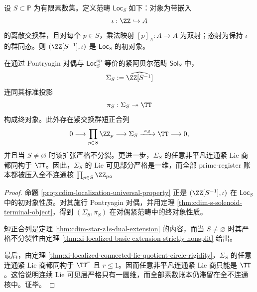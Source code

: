 \begin{theorem}\label{thm:conclusion-finite-prime-solenoid-terminal-object}
设 \(S\subset \mathbb P\) 为有限素数集。定义范畴 \(\mathsf{Loc}_S\) 如下：对象为带嵌入
\[
\iota:\ZZ\hookrightarrow A
\]
的离散交换群，且对每个 \(p\in S\)，乘法映射 \([p]_A:A\to A\) 为双射；态射为保持 \(\iota\) 的群同态。则 \((\ZZ[S^{-1}],\iota)\) 是 \(\mathsf{Loc}_S\) 的初对象。

在通过 Pontryagin 对偶与 \(\mathsf{Loc}_S^{\mathrm{op}}\) 等价的紧阿贝尔范畴 \(\mathsf{Sol}_S\) 中，
\[
\Sigma_S:=\widehat{\ZZ[S^{-1}]}
\]
连同其标准投影
\[
\pi_S:\Sigma_S\twoheadrightarrow \TT
\]
构成终对象。此外存在紧交换群短正合列
\[
0\longrightarrow \prod_{p\in S}\ZZ_p
\longrightarrow \Sigma_S
\xrightarrow{\ \pi_S\ }
\TT
\longrightarrow 0,
\]
并且当 \(S\neq\varnothing\) 时该扩张严格不分裂。更进一步，\(\Sigma_S\) 的任意非平凡连通紧 Lie 商都同构于 \(\TT\)。因此，\(\Sigma_S\) 的 Lie 可见部分严格是一维，而全部 prime-register 账本都被压入全不连通核 \(\prod_{p\in S}\ZZ_p\)。
\end{theorem}
\begin{proof}
命题 \ref{prop:cdim-localization-universal-property} 正是 \((\ZZ[S^{-1}],\iota)\) 在 \(\mathsf{Loc}_S\) 中的初对象性质。对其施行 Pontryagin 对偶，并用定理 \ref{thm:cdim-s-solenoid-terminal-object}，得到 \((\Sigma_S,\pi_S)\) 在对偶紧范畴中的终对象性质。

短正合列是定理 \ref{thm:cdim-star-z1s-dual-extension} 的内容，而当 \(S\neq\varnothing\) 时其严格不分裂性由定理 \ref{thm:xi-localized-basic-extension-strictly-nonsplit} 给出。

最后，由定理 \ref{thm:xi-localized-connected-lie-quotient-circle-rigidity}，\(\Sigma_S\) 的任意连通紧 Lie 商都同构于 \(\TT^r\) 且 \(r\le 1\)。因而任意非平凡连通紧 Lie 商只能是 \(\TT\)。这恰说明连续 Lie 可见层严格只有一圆维，而全部素数账本仍滞留在全不连通核中。证毕。
\end{proof}

